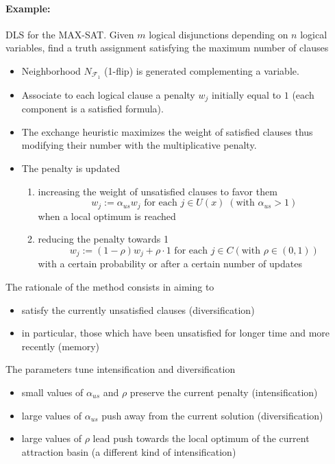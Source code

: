 \paragraph{Example:} DLS for the MAX-SAT. Given $m$ logical disjunctions depending on $n$ logical variables, find a truth assignment satisfying the maximum number of clauses
\begin{itemize}
	\item Neighborhood $N_{\mathcal{F}_1}$ (1-flip) is generated complementing a variable.\\
	
	\item Associate to each logical clause a penalty $w_j$ initially equal to $1$ (each component is a satisfied formula).\\
	
	\item The exchange heuristic maximizes the weight of satisfied clauses thus modifying their number with the multiplicative penalty.\\
	
	\item The penalty is updated
	\begin{enumerate}
		\item increasing the weight of unsatisfied clauses to favor them
		$$ w_j := \alpha_{us} w_j \text{ for each } j \in U (x) \; (\text{with } \alpha_{us} > 1) $$
		when a local optimum is reached
		
		\item reducing the penalty towards 1
		$$ w_j := (1 - \rho) w_j + \rho \cdot 1 \text{ for each } j \in C (\text{with } \rho \in (0, 1)) $$
		with a certain probability or after a certain number of updates
	\end{enumerate}
\end{itemize}

The rationale of the method consists in aiming to
\begin{itemize}
	\item satisfy the currently unsatisfied clauses (diversification)
	
	\item in particular, those which have been unsatisfied for longer time and more recently (memory)
\end{itemize}

The parameters tune intensification and diversification
\begin{itemize}
	\item small values of $\alpha_{us}$ and $\rho$ preserve the current penalty (intensification)
	
	\item large values of $\alpha_{us}$ push away from the current solution (diversification)
	
	\item large values of $\rho$ lead push towards the local optimum of the current attraction basin (a different kind of intensification)
\end{itemize}

